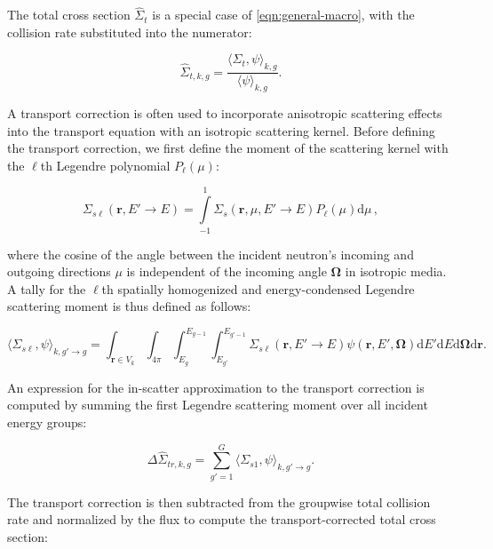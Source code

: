 The total cross section $\hat{\Sigma}_{t}$ is a special case of \cref{eqn:general-macro}, with the collision rate substituted into the numerator:

\begin{equation}
\label{eqn:total-macro}
\hat{\Sigma}_{t,k,g} = \frac{\langle \Sigma_{t}, \psi \rangle_{k,g}}{\langle \psi \rangle_{k,g}}.
\end{equation}

A transport correction is often used to incorporate anisotropic scattering effects into the transport equation with an isotropic scattering kernel. Before defining the transport correction, we first define the moment of the scattering kernel with the $\ell$th Legendre polynomial $P_{\ell}(\mu)$:

\begin{equation}
\label{eqn:scatt-moment}
\Sigma_{s\ell}(\mathbf{r},E'\rightarrow E) = \displaystyle\int\limits_{-1}^{1} \Sigma_{s}(\mathbf{r},\mu,{E'\rightarrow E})P_{\ell}(\mu)\mathrm{d}\mu\,,
\end{equation}

\noindent where the cosine of the angle between the incident neutron's incoming and outgoing directions $\mu$ is independent of the incoming angle $\mathbf{\Omega}$ in isotropic media. A tally for the $\ell$th spatially homogenized and energy-condensed Legendre scattering moment is thus defined as follows:

\begin{equation}
\label{eqn:flux-weight-scatt-moment}
\langle \Sigma_{s\ell}, \psi \rangle_{k,g'\rightarrow g} = \int_{\mathbf{r} \in V_{k}} \int_{4\pi} \int_{E_{g}}^{E_{g-1}} \int_{E_{g'}}^{E_{g'-1}} \Sigma_{s\ell}(\mathbf{r},E'\rightarrow E)\psi(\mathbf{r},E',\mathbf{\Omega}) \mathrm{d}E'\mathrm{d}E\mathrm{d}\mathbf{\Omega}\mathrm{d}\mathbf{r}.
\end{equation}

An expression for the in-scatter approximation\cite{yamamoto2008simplified} to the transport correction is computed by summing the first Legendre scattering moment over all incident energy groups:

\begin{equation}
\label{eqn:transport-corr-macro}
\Delta\hat{\Sigma}_{tr,k,g} = \displaystyle\sum\limits_{g'=1}^{G} \langle{\Sigma_{s1}, \psi \rangle_{k,g'\rightarrow g}}.
\end{equation}

\noindent The transport correction is then subtracted from the groupwise total collision rate and normalized by the flux to compute the transport-corrected total cross section:

